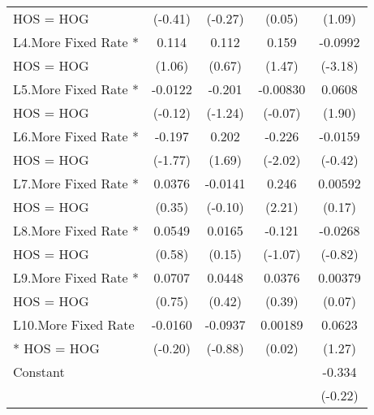 {\begin{tabular}{l*{4}{c}}
HOS = HOG           &     (-0.41)         &     (-0.27)         &      (0.05)         &      (1.09)         \\
[1em]
L4.More Fixed Rate *&       0.114         &       0.112         &       0.159         &     -0.0992\sym{**} \\
HOS = HOG           &      (1.06)         &      (0.67)         &      (1.47)         &     (-3.18)         \\
[1em]
L5.More Fixed Rate *&     -0.0122         &      -0.201         &    -0.00830         &      0.0608         \\
HOS = HOG           &     (-0.12)         &     (-1.24)         &     (-0.07)         &      (1.90)         \\
[1em]
L6.More Fixed Rate *&      -0.197         &       0.202         &      -0.226\sym{*}  &     -0.0159         \\
HOS = HOG           &     (-1.77)         &      (1.69)         &     (-2.02)         &     (-0.42)         \\
[1em]
L7.More Fixed Rate *&      0.0376         &     -0.0141         &       0.246\sym{*}  &     0.00592         \\
HOS = HOG           &      (0.35)         &     (-0.10)         &      (2.21)         &      (0.17)         \\
[1em]
L8.More Fixed Rate *&      0.0549         &      0.0165         &      -0.121         &     -0.0268         \\
HOS = HOG           &      (0.58)         &      (0.15)         &     (-1.07)         &     (-0.82)         \\
[1em]
L9.More Fixed Rate *&      0.0707         &      0.0448         &      0.0376         &     0.00379         \\
HOS = HOG           &      (0.75)         &      (0.42)         &      (0.39)         &      (0.07)         \\
[1em]
L10.More Fixed Rate &     -0.0160         &     -0.0937         &     0.00189         &      0.0623         \\
* HOS = HOG         &     (-0.20)         &     (-0.88)         &      (0.02)         &      (1.27)         \\
[1em]
Constant            &                     &                     &                     &      -0.334         \\
                    &                     &                     &                     &     (-0.22)         \\

\end{tabular}}
